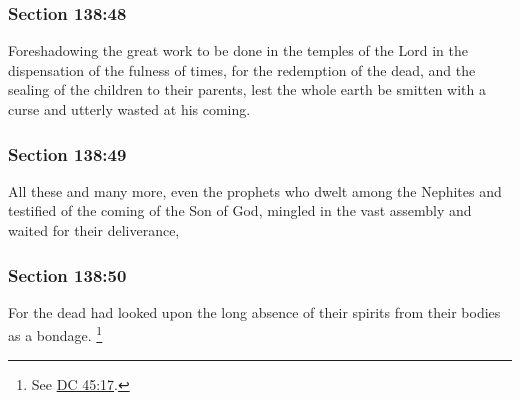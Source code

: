 	\subsubsection{Section 138:48} %
		\label{DC138-48}

		Foreshadowing the great work to be done in the temples of the Lord in the dispensation of the fulness of times, for the redemption of the dead, and the sealing of the children to their parents, lest the whole earth be smitten with a curse and utterly wasted at his coming.


	\subsubsection{Section 138:49} %
		\label{DC138-49}

		All these and many more, even the prophets who dwelt among the Nephites and testified of the coming of the Son of God, mingled in the vast assembly and waited for their deliverance,


	\subsubsection{Section 138:50} %
		\label{DC138-50}

		For the dead had looked upon the long absence of their spirits from their bodies as a bondage.%
			\footnote{%
				See \hyperref[DC45-17]{DC 45:17}.
				}


